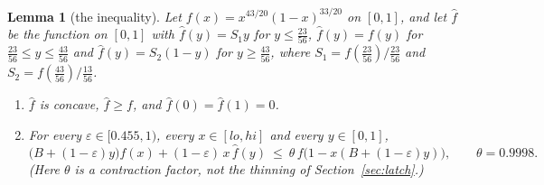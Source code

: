 \documentclass[11pt]{amsart}
\newtheorem{lemma}[theorem]{Lemma}
\theoremstyle{definition}
\theoremstyle{remark}
\newcommand{\eps}{\varepsilon}
\begin{document}
\begin{lemma}[the inequality]\label{lem:potential}
Let $f(x)=x^{43/20}(1-x)^{33/20}$ on $[0,1]$, and let $\hat f$ be the function on $[0,1]$ with
$\hat f(y)=S_1y$ for $y\le\frac{23}{56}$, $\hat f(y)=f(y)$ for
$\frac{23}{56}\le y\le\frac{43}{56}$ and $\hat f(y)=S_2(1-y)$ for $y\ge\frac{43}{56}$, where
$S_1=f(\frac{23}{56})/\frac{23}{56}$ and $S_2=f(\frac{43}{56})/\frac{13}{56}$.
\begin{enumerate}[label=(\alph*),leftmargin=2.4em]
\item $\hat f$ is concave, $\hat f\ge f$, and $\hat f(0)=\hat f(1)=0$.
\item For every $\eps\in[0.455,1)$, every $x\in[lo,hi]$ and every $y\in[0,1]$,
\[
\bigl(B+(1-\eps)y\bigr)f(x)+(1-\eps)\,x\,\hat f(y)\ \le\ \theta\,f\bigl(1-x(B+(1-\eps)y)\bigr),
\qquad\theta=0.9998 .
\]
(Here $\theta$ is a contraction factor, not the thinning of Section~\ref{sec:latch}.)
\end{enumerate}
\end{lemma}
\end{document}
